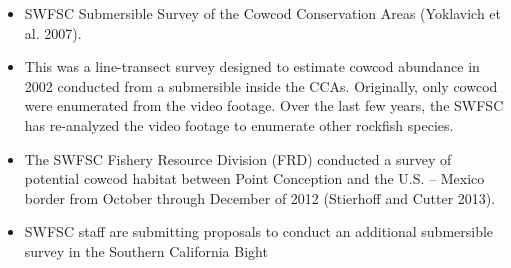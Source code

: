 \documentclass[11pt,
  english,
]{article}
\begin{document}
\begin{itemize}

  \begin{itemize}
  \item


    SWFSC Submersible Survey of the Cowcod Conservation Areas {(Yoklavich et al. 2007)\leavevmode\tagmcend\tagstructend}.

    \tagmcend\tagstructend\tagstructend

    \tagmcend\tagstructend\tagstructend
  \item


    This was a line-transect survey designed to estimate cowcod abundance in 2002 conducted from a submersible inside the CCAs. Originally, only cowcod were enumerated from the video footage. Over the last few years, the SWFSC has re-analyzed the video footage to enumerate other rockfish species.

    \tagmcend\tagstructend\tagstructend

    \tagmcend\tagstructend\tagstructend
  \item


    The SWFSC Fishery Resource Division (FRD) conducted a survey of potential cowcod habitat between Point Conception and the U.S. -- Mexico border from October through December of 2012 {(Stierhoff and Cutter 2013)\leavevmode\tagmcend\tagstructend}.

    \tagmcend\tagstructend\tagstructend

    \tagmcend\tagstructend\tagstructend
  \item


    SWFSC staff are submitting proposals to conduct an additional submersible survey in the Southern California Bight


\end{itemize}
\end{itemize}
\end{document}
